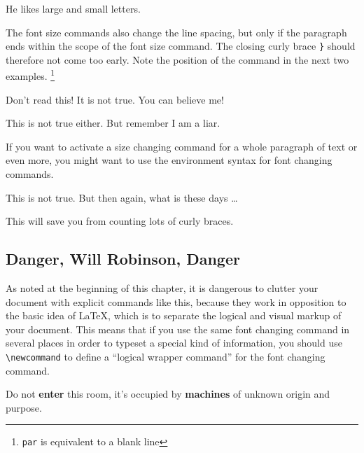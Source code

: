 \begin{example}
He likes {\LARGE large and 
{\small small} letters}. 
\end{example}
 
The font size commands also change the line spacing, but only if the
paragraph ends within the scope of the font size command. The closing curly
brace \verb|}| should therefore not come too early.  Note the position of
the  command in the next two examples. \footnote{\texttt{\bs{}par}
is equivalent to a blank line}


\begin{example}
{\Large Don't read this! 
 It is not true.
 You can believe me!\par}
\end{example}

\begin{example}
{\Large This is not true either.
But remember I am a liar.}\par
\end{example}

If you want to activate a size changing command for a whole paragraph
of text or even more, you might want to use the environment syntax for
font changing commands.

\begin{example}
\begin{Large} 
This is not true.
But then again, what is these
days \ldots
\end{Large}
\end{example}

\noindent This will save you from counting lots of curly braces.

\subsection{Danger, Will Robinson, Danger}

As noted at the beginning of this chapter, it is dangerous to clutter
your document with explicit commands like this, because they work in
opposition to the basic idea of \LaTeX{}, which is to separate the
logical and visual markup of your document.  This means that if you
use the same font changing command in several places in order to
typeset a special kind of information, you should use
\verb|\newcommand| to define a ``logical wrapper command'' for the font
changing command.

\begin{example}
\newcommand{\oops}[1]{%
 \textbf{#1}}
Do not \oops{enter} this room,
it's occupied by \oops{machines}
of unknown origin and purpose.
\end{example}

